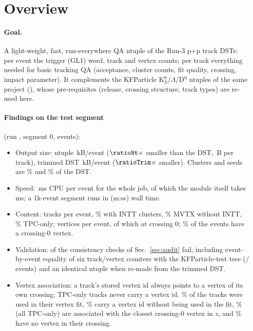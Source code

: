 \section{Overview}
\label{sec:overview}

\paragraph{Goal.} A light-weight, fast, run-everywhere QA ntuple of the Run-3 p+p track DSTs: per
event the trigger (GL1) word, track and vertex counts; per track everything needed for basic
tracking QA (acceptance, cluster counts, fit quality, crossing, impact parameter). It complements
the KFParticle K$^0_S$/$\Lambda$/D$^0$ ntuples of the same project (),
whose pre-requisites (release, crossing structure, track types) are re-used here.

\paragraph{Findings on the test segment} (run \runNo, segment 0, \nEvents{} events):
\begin{itemize}\itemsep0pt
\item Output size: ntuple \sizeNtkB\,kB/event ($\ratioNt\times$ smaller than the DST,
  \bytesPerTrk\,B per track), trimmed DST \sizeTrimkB\,kB/event ($\ratioTrim\times$ smaller).
  Clusters and seeds are \pctClus\% and \pctSeeds\% of the DST.
\item Speed: \cpuMsPerEv\,ms CPU per event for the whole job, of which the module itself takes
  \modMsPerEv\,ms; a 1k-event segment runs in \wallTime{} (m:ss) wall time.
\item Content: \trkPerEv{} tracks per event, \fracINTT\% with INTT clusters, \fracMVTXonly\% MVTX
  without INTT, \fracTpcOnly\% TPC-only; \vtxPerEv{} vertices per event, of which \vtxXzeroPerEv{}
  at crossing 0; \fracEvVtxXzero\% of the events have a crossing-0 vertex.
\item Validation: \nFailed{} of the \nChecks{} consistency checks of Sec.~\ref{sec:audit} fail, including
  event-by-event equality of six track/vertex counters with the KFParticle-test 
  tree (\nKFPAgree/\nEvents{} events) and an identical ntuple when re-made from the trimmed DST.
\item Vertex association: a track's stored vertex id always points to a vertex of its own
  crossing; TPC-only tracks never carry a vertex id. \fracMatchOne\% of the tracks were used in
  their vertex fit, \fracMatchTwo\% carry a vertex id without being used in the fit,
  \fracMatchThree\% (all TPC-only) are associated with the closest crossing-0 vertex in $z$, and
  \fracMatchZero\% have no vertex in their crossing.
\end{itemize}


